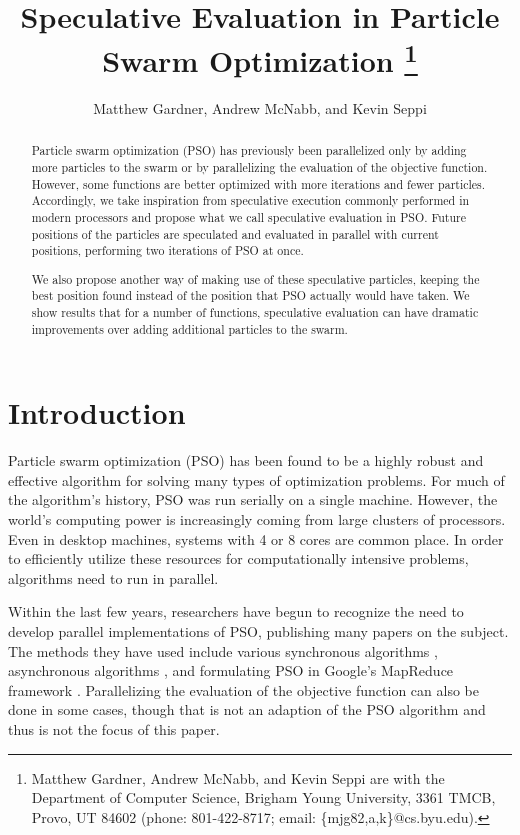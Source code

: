 \documentclass[conference,letterpaper]{IEEEtran}
\title{\ \\ \LARGE\bf Speculative Evaluation in Particle Swarm Optimization%
\thanks{Matthew Gardner, Andrew McNabb, and Kevin Seppi are with the Department
of Computer Science, Brigham Young University, 3361 TMCB, Provo, UT 84602
(phone: 801-422-8717; email: \{mjg82,a,k\}@cs.byu.edu).}%
}
\date{}
\author{Matthew Gardner, Andrew McNabb, and Kevin Seppi}
\begin{document}
\maketitle

\begin{abstract}

Particle swarm optimization (PSO) has previously been parallelized only by 
adding more particles to the swarm or by parallelizing the evaluation of the
objective function.  However, some functions are better optimized with more
iterations and fewer particles.  Accordingly, we take inspiration from 
speculative execution commonly performed in modern processors and propose what
we call speculative evaluation in PSO.  Future positions of the particles are
speculated and evaluated in parallel with current positions, performing two
iterations of PSO at once.

We also propose another way of making use of these speculative particles,
keeping the best position found instead of the position that PSO actually would
have taken.  We show results that for a number of functions, speculative
evaluation can have dramatic improvements over adding additional particles to
the swarm.

\end{abstract}

\section{Introduction}
\label{sec:intro}

Particle swarm optimization (PSO) has been found to be a highly robust and
effective algorithm for solving many types of optimization problems.  For much
of the algorithm's history, PSO was run serially on a single machine.  However,
the world's computing power is increasingly coming from large clusters of
processors.  Even in desktop machines, systems with 4 or 8 cores are common
place.  In order to efficiently utilize these resources for computationally
intensive problems, algorithms need to run in parallel.

Within the last few years, researchers have begun to recognize the need to
develop parallel implementations of PSO, publishing many papers on the subject.
The methods they have used include various synchronous algorithms
\cite{belal-ijicis04,chu-sci06,jin-aps05,parsopoulos-aia04,schutte-ijnme04},
asynchronous algorithms \cite{koh-ijnme06,mostaghim-report06,venter-wcsmo05},
and formulating PSO in Google's MapReduce framework \cite{mcnabb-cec07}.
Parallelizing the evaluation of the objective function can also be done in some
cases, though that is not an adaption of the PSO algorithm and thus is not the
focus of this paper.
\end{document}
